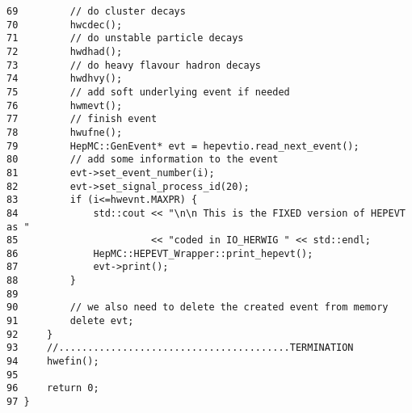 \begin{DocInclude}
\begin{verbatim}
69         // do cluster decays
70         hwcdec();
71         // do unstable particle decays
72         hwdhad();
73         // do heavy flavour hadron decays
74         hwdhvy();
75         // add soft underlying event if needed
76         hwmevt();
77         // finish event
78         hwufne();
79         HepMC::GenEvent* evt = hepevtio.read_next_event();
80         // add some information to the event
81         evt->set_event_number(i);
82         evt->set_signal_process_id(20);
83         if (i<=hwevnt.MAXPR) {
84             std::cout << "\n\n This is the FIXED version of HEPEVT as "
85                       << "coded in IO_HERWIG " << std::endl;
86             HepMC::HEPEVT_Wrapper::print_hepevt();
87             evt->print();
88         }
89 
90         // we also need to delete the created event from memory
91         delete evt;
92     }
93     //........................................TERMINATION
94     hwefin();
95 
96     return 0;
97 }
\end{verbatim}
\end{DocInclude}
 
